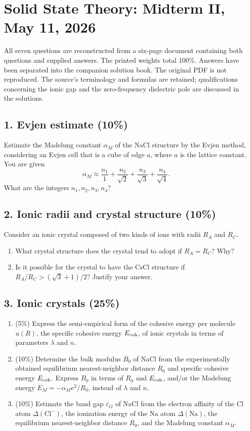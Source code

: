 \chapter{Solid State Theory: Midterm II, May 11, 2026}
\label{q:theory-2026-05-midterm-ii}
\begin{sourceNote}
All seven questions are reconstructed from a six-page document containing both questions and supplied answers. The printed weights total 100\%. Answers have been separated into the companion solution book. The original PDF is not reproduced. The source's terminology and formulas are retained; qualifications concerning the ionic gap and the zero-frequency dielectric pole are discussed in the solutions.
\end{sourceNote}

\section*{1. Evjen estimate (10\%)}
Estimate the Madelung constant $\alpha_M$ of the NaCl structure by the Evjen method, considering an Evjen cell that is a cube of edge $a$, where $a$ is the lattice constant. You are given
\[
\alpha_M\approx\frac{n_1}{1}+\frac{n_2}{\sqrt2}
+\frac{n_3}{\sqrt3}+\frac{n_4}{\sqrt4}.
\]
What are the integers $n_1,n_2,n_3,n_4$?

\section*{2. Ionic radii and crystal structure (10\%)}
Consider an ionic crystal composed of two kinds of ions with radii $R_A$ and $R_C$.
\begin{enumerate}[label=(\alph*)]
\item What crystal structure does the crystal tend to adopt if $R_A=R_C$? Why?
\item Is it possible for the crystal to have the CsCl structure if
$R_A/R_C>(\sqrt3+1)/2$? Justify your answer.
\end{enumerate}

\section*{3. Ionic crystals (25\%)}
\begin{enumerate}[label=(\alph*)]
\item (5\%) Express the semi-empirical form of the cohesive energy per molecule $u(R)$, the specific cohesive energy $E_{\rm coh}$, of ionic crystals in terms of parameters $\lambda$ and $n$.
\item (10\%) Determine the bulk modulus $B_0$ of NaCl from the experimentally obtained equilibrium nearest-neighbor distance $R_0$ and specific cohesive energy $E_{\rm coh}$. Express $B_0$ in terms of $R_0$ and $E_{\rm coh}$, and/or the Madelung energy $E_M=-\alpha_M e^2/R_0$, instead of $\lambda$ and $n$.
\item (10\%) Estimate the band gap $\varepsilon_G$ of NaCl from the electron affinity of the Cl atom $\Delta(\mathrm{Cl}^-)$, the ionization energy of the Na atom $\Delta(\mathrm{Na})$, the equilibrium nearest-neighbor distance $R_0$, and the Madelung constant $\alpha_M$.
\end{enumerate}

